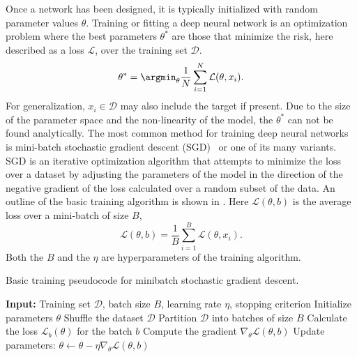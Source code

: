 Once a network has been designed, it is typically initialized with random parameter values $\theta$.
Training or fitting a deep neural network is an optimization problem where the best parameters $\theta^*$ are those that minimize the risk, here described as a loss $\mathcal{L}$, over the training set $\mathcal{D}$.
\begin{equation}
    \theta^* = \argmin_{\theta} \frac{1}{N} \sum_{i=1}^N \mathcal{L}(\theta, x_i).
\end{equation}
For generalization, $x_i \in \mathcal{D}$ may also include the target if present.
Due to the size of the parameter space and the non-linearity of the model, the $\theta^*$ can not be found analytically.
The most common method for training deep neural networks is mini-batch stochastic gradient descent (SGD)~\cite{Perceptron} or one of its many variants.
SGD is an iterative optimization algorithm that attempts to minimize the loss over a dataset by adjusting the parameters of the model in the direction of the negative gradient of the loss calculated over a random subset of the data.
An outline of the basic training algorithm is shown in .
Here $\mathcal{L}(\theta, b)$ is the average loss over a mini-batch of size $B$,
\begin{equation}
    \mathcal{L}(\theta, b) = \frac{1}{B} \sum_{i=1}^B \mathcal{L}(\theta, x_i).
\end{equation}
Both the $B$ and the $\eta$ are hyperparameters of the training algorithm.

\begin{algorithm}
    \caption{Basic training pseudocode for minibatch stochastic gradient descent.}
    \label{alg:gradient_descent}
    \begin{algorithmic}[1]
        \State \textbf{Input:} Training set $\mathcal{D}$, batch size $B$, learning rate $\eta$, stopping criterion
        \State Initialize parameters $\theta$
        \Repeat {}
        \State Shuffle the dataset $\mathcal{D}$
        \State Partition $\mathcal{D}$ into batches of size $B$
        \State Calculate the loss $\mathcal{L}_b(\theta)$ for the batch $b$
        \State Compute the gradient $\nabla_\theta \mathcal{L}(\theta, b)$
        \State Update parameters: $\theta \gets \theta - \eta \nabla_\theta \mathcal{L}(\theta, b)$
        \EndFor
    \end{algorithmic}
\end{algorithm}

